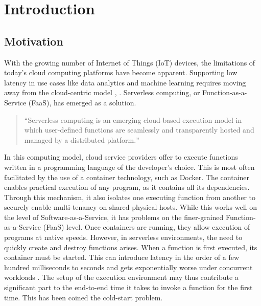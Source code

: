 \chapter{Introduction}
\label{chapter:introduction}



\newcommand{\inl}[1]{\texttt|#1|}

\newcommand{\quot}[1]{\foreignquote{german}{#1}}

\section{Motivation}

With the growing number of Internet of Things (IoT) devices, the limitations of today's cloud computing platforms have become apparent. Supporting low latency in use cases like data analytics and machine learning requires moving away from the cloud-centric model \cite{Nastic2017}, \cite{Rausch2019}. Serverless computing, or Function-as-a-Service (FaaS), has emerged as a solution.

\begin{quote}
  \quot{Serverless computing is an emerging cloud-based execution model in which user-defined functions are seamlessly and transparently hosted and managed by a distributed platform.} \cite{Nastic2017}
\end{quote}

In this computing model, cloud service providers offer to execute functions written in a programming language of the developer's choice. This is most often facilitated by the use of a container technology, such as Docker. The container enables practical execution of any program, as it contains all its dependencies. Through this mechanism, it also isolates one executing function from another to securely enable multi-tenancy on shared physical hosts. While this works well on the level of Software-as-a-Service, it has problems on the finer-grained Function-as-a-Service (FaaS) level. Once containers are running, they allow execution of programs at native speeds. However, in serverless environments, the need to quickly create and destroy functions arises. When a function is first executed, its container must be started. This can introduce latency in the order of a few hundred milliseconds to seconds \cite{Manner2018} and gets exponentially worse under concurrent workloads \cite{Mohan2019}. The setup of the execution environment may thus contribute a significant part to the end-to-end time it takes to invoke a function for the first time. This has been coined the cold-start problem.


